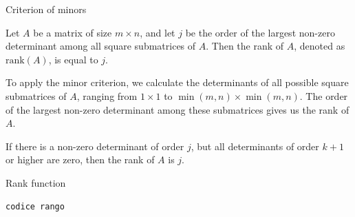\documentclass{beamer}
\begin{document}
\begin{frame}{Criterion of minors}

    Let $A$ be a matrix of size $m \times n$, and let $j$ be the order of the largest non-zero determinant among all square submatrices of $A$. Then the rank of $A$, denoted as $\text{rank}(A)$, is equal to $j$.

    To apply the minor criterion, we calculate the determinants of all possible square submatrices of $A$, ranging from $1 \times 1$ to $\min(m,n) \times \min(m,n)$. The order of the largest non-zero determinant among these submatrices gives us the rank of $A$.

    If there is a non-zero determinant of order $j$, but all determinants of order $k+1$ or higher are zero, then the rank of $A$ is $j$.
\end{frame}

\begin{frame}[fragile]{Rank function}
    \begin{lstlisting}[language=Python]
            codice rango
        \end{lstlisting}
\end{frame}
\end{document}
